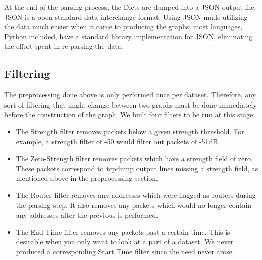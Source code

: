 At the end of the parsing process, the Dicts are dumped into a JSON output file.
JSON is a open standard data interchange format.
Using JSON made utilizing the data much easier when it came to producing the graphs; most languages, Python included, have a standard library implementation for JSON, eliminating the effort spent in re-parsing the data. %

\subsection*{Filtering}
The preprocessing done above is only performed once per dataset.
Therefore, any sort of filtering that might change between two graphs must be done immediately before the construction of the graph.
We built four filters to be run at this stage:
\begin{itemize}
\item The Strength filter removes packets below a given strength threshold.
  For example, a strength filter of -50 would filter out packets of -51dB.
\item The Zero-Strength filter removes packets which have a strength field of zero.
  These packets correspond to tcpdump output lines missing a strength field, as mentioned above in the preprocessing section.
\item The Router filter removes any addresses which were flagged as routers during the parsing step.
  It also removes any packets which would no longer contain any addresses after the previous is performed.
\item The End Time filter removes any packets past a certain time.
  This is desirable when you only want to look at a part of a dataset.
  We never produced a corresponding Start Time filter since the need never arose.
\end{itemize}

